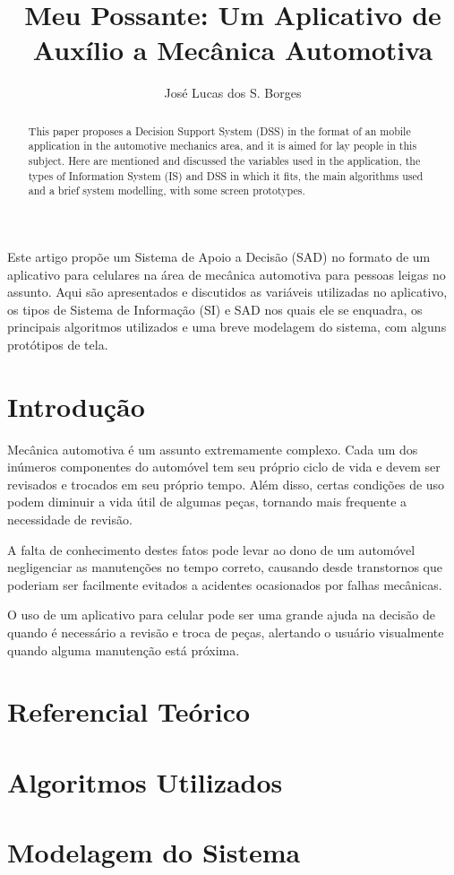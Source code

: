 \documentclass[12pt]{article}
\title{Meu Possante: Um Aplicativo de Auxílio a Mecânica Automotiva}
\author{José Lucas dos S. Borges{\inst1}}
\begin{document}
\maketitle

\begin{abstract}
    This paper proposes a Decision Support System (DSS) in the format of an
    mobile application in the automotive mechanics area, and it is aimed for
    lay people in this subject. Here are mentioned and discussed the variables
    used in the application, the types of Information System (IS) and DSS in
    which it fits, the main algorithms used and a brief system modelling, with
    some screen prototypes.
\end{abstract}

\begin{resumo}
    Este artigo propõe um Sistema de Apoio a Decisão (SAD) no formato de um
    aplicativo para celulares na área de mecânica automotiva para pessoas leigas
    no assunto. Aqui são apresentados e discutidos as variáveis utilizadas no
    aplicativo, os tipos de Sistema de Informação (SI) e SAD nos quais ele se
    enquadra, os principais algoritmos utilizados e uma breve modelagem do
    sistema, com alguns protótipos de tela.
\end{resumo}


\section{Introdução} \label{sec:introducao}

    Mecânica automotiva é um assunto extremamente complexo. Cada um dos inúmeros
    componentes do automóvel tem seu próprio ciclo de vida e devem ser revisados
    e trocados em seu próprio tempo. Além disso, certas condições de uso podem
    diminuir a vida útil de algumas peças, tornando mais frequente a necessidade
    de revisão.

    A falta de conhecimento destes fatos pode levar ao dono de um automóvel
    negligenciar as manutenções no tempo correto, causando desde transtornos
    que poderiam ser facilmente evitados a acidentes ocasionados por falhas
    mecânicas.

    O uso de um aplicativo para celular pode ser uma grande ajuda na decisão de
    quando é necessário a revisão e troca de peças, alertando o usuário
    visualmente quando alguma manutenção está próxima.

\section{Referencial Teórico} \label{sec:referencialteorico}


\section{Algoritmos Utilizados} \label{sec:algoritmos}


\section{Modelagem do Sistema} \label{sec:modelagem}




\end{document}
